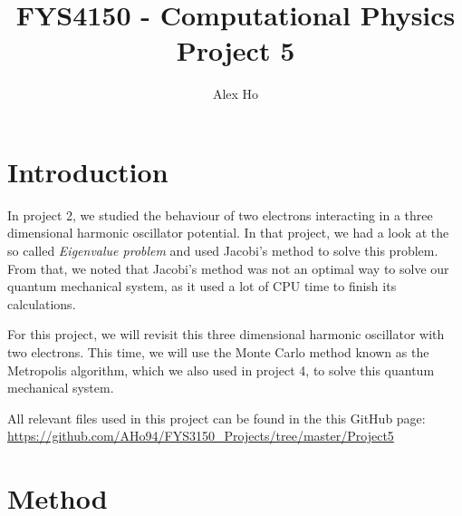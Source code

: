 \documentclass[12pt]{article}
\author{Alex Ho}
\title{FYS4150 - Computational Physics \\ Project 5}
\begin{document}
\maketitle
\begin{abstract}
\end{abstract}
\newpage
\tableofcontents
\newpage
\section{Introduction} \label{section:intro}
In project 2, we studied the behaviour of two electrons interacting in a three dimensional harmonic oscillator potential. In that project, we had a look at the so called \emph{Eigenvalue problem} and used Jacobi's method to solve this problem. From that, we noted that Jacobi's method was not an optimal way to solve our quantum mechanical system, as it used a lot of CPU time to finish its calculations.

For this project, we will revisit this three dimensional harmonic oscillator with two electrons. This time, we will use the Monte Carlo method known as the Metropolis algorithm, which we also used in project 4, to solve this quantum mechanical system.

All relevant files used in this project can be found in the this GitHub page:
\url{https://github.com/AHo94/FYS3150_Projects/tree/master/Project5}
\section{Method} \label{section:method}
\end{document}
